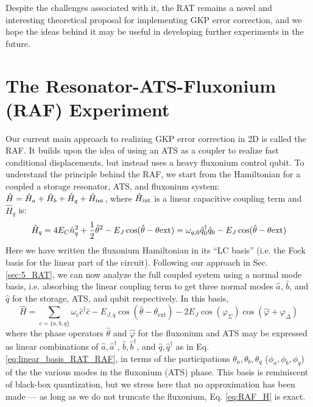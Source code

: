Despite the challenges associated with it, the RAT remains a novel and interesting theoretical proposal for implementing GKP error correction, and we hope the ideas behind it may be useful in developing further experiments in the future. 
 \clearpage

\section{The Resonator-ATS-Fluxonium (RAF) Experiment \label{sec:5_RAF}}

Our current main approach to realizing GKP error correction in 2D is called the RAF. It builds upon the idea of using an ATS as a coupler to realize fast conditional displacements, but instead uses a heavy fluxonium control qubit. To understand the principle behind the RAF, we start from the Hamiltonian for a coupled a storage resonator, ATS, and fluxonium system: $\hat{H} = \hat{H}_a + \hat{H}_b + \hat{H}_q + \hat{H}_{\rm int}$, where $\hat{H}_{\rm int}$ is a linear capacitive coupling term and $\hat{H}_q$ is:
\begin{equation}
    \hat{H}_q = 4E_C \hat{n}_q^2 + \frac{1}{2}\hat{\theta}^2 - E_J\cos(\hat{\theta}-\theta{\rm ext}) = \omega_{q, 0} \hat{q}_0^\dagger\hat{q}_0 - E_J\cos(\hat{\theta}-\theta{\rm ext})
\end{equation}
Here we have written the fluxonium Hamiltonian in its ``LC basis'' (i.e. the Fock basis for the linear part of the circuit). Following our approach in Sec. \ref{sec:5_RAT}, we can now analyze the full coupled system using a normal mode basis, i.e. absorbing the linear coupling term to get three normal modes $\hat{a}$, $\hat{b}$, and $\hat{q}$ for the storage, ATS, and qubit respectively. In this basis, 
\begin{equation}
    \hat{H} = \sum_{c = \{a, b, q\}}\omega_c \hat{c}^\dagger \hat{c} - E_{J,q}\cos(\hat{\theta}-\theta_\mathrm{ext}) - 2E_J \cos(\varphi_\Sigma)\cos(\hat{\varphi} + \varphi_\Delta)
    \label{eq:RAF_H}
\end{equation}
where the phase operators $\hat{\theta}$ and $\hat{\varphi}$ for the fluxonium and ATS may be expressed as linear combinations of $\hat{a}, \hat{a}^\dagger$, $\hat{b}, \hat{b}^\dagger$, and $\hat{q}, \hat{q}^\dagger$ as in Eq. \eqref{eq:linear_basis_RAT_RAF}, in terms of the participations $\theta_a, \theta_b, \theta_q$ ($\phi_a, \phi_b, \phi_q$) of the the various modes in the fluxonium (ATS) phase. This basis is reminiscent of black-box quantization, but we stress here that no approximation has been made --- as long as we do not truncate the fluxonium, Eq. \eqref{eq:RAF_H} is exact. 

